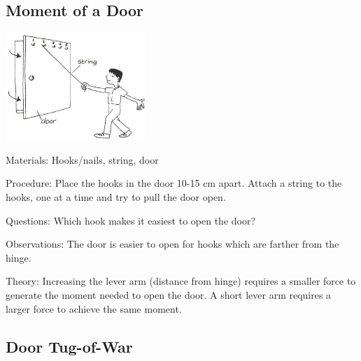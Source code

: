 \begin{multicols}{2}
\subsection{Moment of a Door}

\begin{center}
\includegraphics[width=0.4\textwidth]{./img/vso/doors-levers.png}
\end{center}

\begin{description*}
\item[Materials:]{Hooks/nails, string, door}
\item[Procedure:]{Place the hooks in the door 10-15 cm apart. Attach a string to the hooks, one at a time and try to pull the door open.}
\item[Questions:]{Which hook makes it easiest to open the door?}
\item[Observations:]{The door is easier to open for hooks which are farther from the hinge.}
\item[Theory:]{Increasing the lever arm (distance from hinge) requires a smaller force to generate the moment needed to open the door. A short lever arm requires a larger force to achieve the same moment.}
\end{description*}

\subsection{Door Tug-of-War}



\end{multicols}
